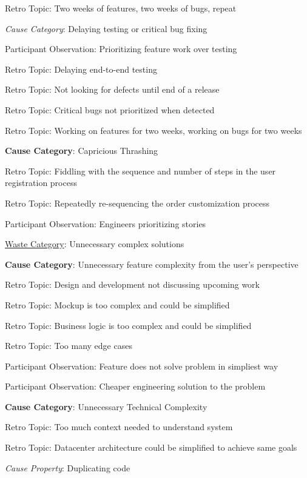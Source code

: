 \quad \quad Retro Topic: Two weeks of features, two weeks of bugs, repeat

\quad \textit{Cause Category}: Delaying testing or critical bug fixing

\quad \quad Participant Observation: Prioritizing feature work over testing

\quad \quad Retro Topic: Delaying end-to-end testing

\quad \quad Retro Topic: Not looking for defects until end of a release

\quad \quad Retro Topic: Critical bugs not prioritized when detected

\quad \quad Retro Topic: Working on features for two weeks, working on bugs for two weeks

\quad \textbf{Cause Category}: Capricious Thrashing

\quad \quad Retro Topic: Fiddling with the sequence and number of steps in the user registration process

\quad \quad Retro Topic: Repeatedly re-sequencing the order customization process

\quad Participant Observation: Engineers prioritizing stories

\underline{Waste Category}: Unnecessary complex solutions

\quad \textbf{Cause Category}: Unnecessary feature complexity from the user's perspective

\quad \quad Retro Topic: Design and development not discussing upcoming work

\quad \quad Retro Topic: Mockup is too complex and could be simplified

\quad \quad Retro Topic: Business logic is too complex and could be simplified

\quad \quad Retro Topic: Too many edge cases

\quad \quad Participant Observation: Feature does not solve problem in simpliest way

\quad \quad Participant Observation: Cheaper engineering solution to the  problem

\quad \textbf{Cause Category}: Unnecessary Technical Complexity

\quad \quad Retro Topic: Too much context needed to understand system

\quad \quad Retro Topic: Datacenter architecture could be simplified to achieve same goals

\quad \quad \textit{Cause Property}: Duplicating code

